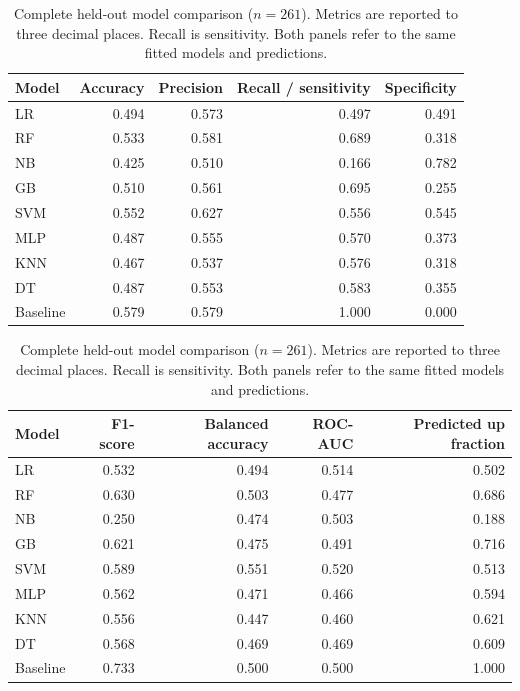 \begin{table}[t]
\centering\footnotesize
\caption{Complete held-out model comparison ($n=261$). Metrics are reported to three decimal places. Recall is sensitivity. Both panels refer to the same fitted models and predictions.}\label{tab:comparison}
\setlength{\tabcolsep}{6pt}
\begin{tabular}{lrrrr}
\toprule
Model & Accuracy & Precision & Recall / sensitivity & Specificity \\
\midrule
LR & 0.494 & 0.573 & 0.497 & 0.491 \\
RF & 0.533 & 0.581 & 0.689 & 0.318 \\
NB & 0.425 & 0.510 & 0.166 & 0.782 \\
GB & 0.510 & 0.561 & 0.695 & 0.255 \\
SVM & 0.552 & 0.627 & 0.556 & 0.545 \\
MLP & 0.487 & 0.555 & 0.570 & 0.373 \\
KNN & 0.467 & 0.537 & 0.576 & 0.318 \\
DT & 0.487 & 0.553 & 0.583 & 0.355 \\
Baseline & 0.579 & 0.579 & 1.000 & 0.000 \\
\bottomrule
\end{tabular}
\par\medskip
\begin{tabular}{lrrrr}
\toprule
Model & F1-score & Balanced accuracy & ROC-AUC & Predicted up fraction \\
\midrule
LR & 0.532 & 0.494 & 0.514 & 0.502 \\
RF & 0.630 & 0.503 & 0.477 & 0.686 \\
NB & 0.250 & 0.474 & 0.503 & 0.188 \\
GB & 0.621 & 0.475 & 0.491 & 0.716 \\
SVM & 0.589 & 0.551 & 0.520 & 0.513 \\
MLP & 0.562 & 0.471 & 0.466 & 0.594 \\
KNN & 0.556 & 0.447 & 0.460 & 0.621 \\
DT & 0.568 & 0.469 & 0.469 & 0.609 \\
Baseline & 0.733 & 0.500 & 0.500 & 1.000 \\
\bottomrule
\end{tabular}
\end{table}
